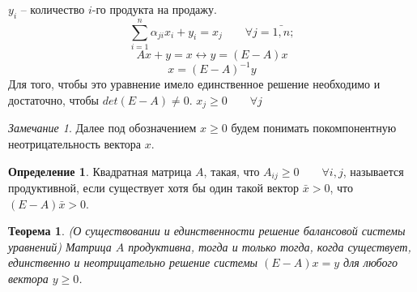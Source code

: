 \documentclass[12pt,a4paper,titlepage,oneside]{book}
\theoremstyle{definition}
\newtheorem{definition}{Определение}[chapter]
\theoremstyle{plain}
\newtheorem{theorem}{Теорема}[chapter]
\theoremstyle{remark}
\newtheorem{remark}{Замечание}[chapter]
\theoremstyle{remark}
\theoremstyle{plain}
\theoremstyle{plain}
\begin{document}
$y_i$ -- количество $i$-го продукта на продажу.
$$\sum \limits_{i = 1}^{n} \alpha_{ji}x_i + y_i = x_j \qquad \forall j = \bar{1,n};$$
$$Ax+y=x \leftrightarrow y=(E - A) x$$
$$x=(E-A)^{-1}y$$
Для того, чтобы это уравнение имело единственное решение необходимо и достаточно, чтобы  $det(E-A) \neq 0$.
$x_j \geq 0 \qquad \forall j$
\begin{remark}
Далее под обозначением $x \geq 0$ будем понимать покомпонентную неотрицательность вектора $x$.
\end{remark}
\begin{definition}
Квадратная матрица $A$, такая, что $A_{ij} \geq 0 \qquad \forall i,j$, называется продуктивной, если существует хотя бы один такой вектор $\bar{x} > 0$, что $(E-A)\bar{x} > 0$.
\end{definition}
\begin{theorem}(О существовании и единственности решение балансовой системы уравнений)
Матрица $A$ продуктивна, тогда и только тогда, когда существует, единственно и неотрицательно решение системы $(E-A)x=y$ для любого  вектора $y \geq 0$.
\end{theorem}
\end{document}
